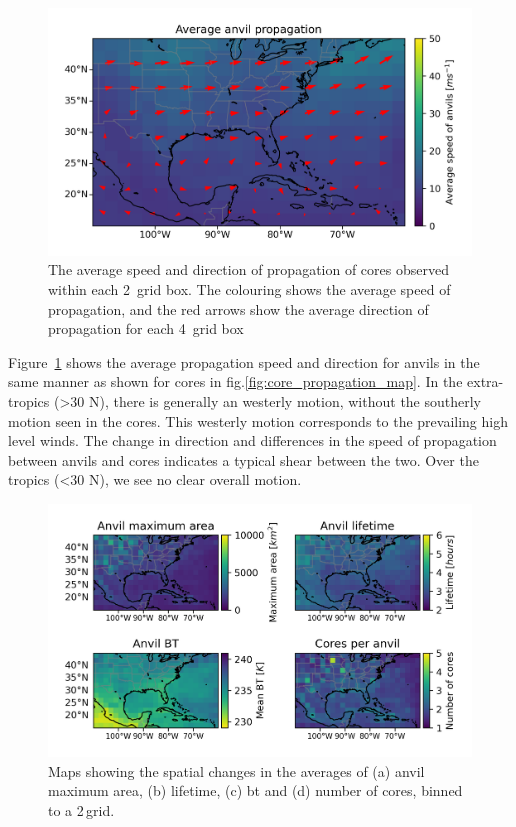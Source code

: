 \begin{figure}[tp]
    \centering
    \includegraphics[width=\textwidth]{figures/chapter2_18.png}
    \caption[
    The average speed and direction of propagation of anvils
    ]{
    The average speed and direction of propagation of cores observed within each 2\textdegree\ grid box. The colouring shows the average speed of propagation, and the red arrows show the average direction of propagation for each 4\textdegree\ grid box
    }
    \label{fig:anvil_propagation_map}
\end{figure}

Figure~\ref{fig:anvil_propagation_map} shows the average propagation speed and direction for anvils in the same manner as shown for cores in fig.\ref{fig:core_propagation_map}.
In the extra-tropics (\textgreater30\,\textdegree\,N), there is generally an westerly motion, without the southerly motion seen in the cores.
This westerly motion corresponds to the prevailing high level winds.
The change in direction and differences in the speed of propagation between anvils and cores indicates a typical shear between the two.
Over the tropics (\textless30\,\textdegree\,N), we see no clear overall  motion.


\begin{figure}[tp]
    \centering
    \includegraphics[width=\textwidth]{figures/chapter2_19.png}
    \caption[
    Maps showing the spatial changes in the averages of anvil maximum area, lifetime, \acrshort{bt} and number of cores
    ]{
    Maps showing the spatial changes in the averages of (a) anvil maximum area, (b) lifetime, (c) \acrshort{bt} and (d) number of cores, binned to a 2\,\textdegree grid.
    }
    \label{fig:anvil_properties_maps}
\end{figure}

